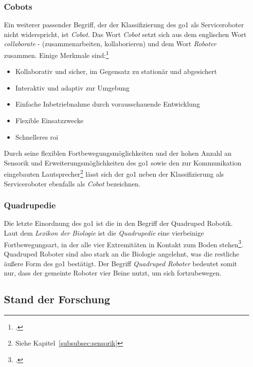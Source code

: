 \subsubsection{Cobots}

Ein weiterer passender Begriff, der der Klassifizierung des \gls{go1} als Serviceroboter nicht widerspricht, ist \emph{Cobot}.
Das Wort \emph{Cobot} setzt sich aus dem englischen Wort \emph{collaborate} - (zusammenarbeiten, kollaborieren) und dem Wort \emph{Roboter}
zusammen.
Einige Merkmale sind:\footcite{statista_robotics_market}

\begin{itemize}
    \item Kollaborativ und sicher, im Gegensatz zu stationär und abgesichert
    \item Interaktiv und adaptiv zur Umgebung
    \item Einfache Inbetriebnahme durch vorausschauende Entwicklung
    \item Flexible Einsatzzwecke
    \item Schnelleres \gls{roi}
\end{itemize}

Durch seine flexiblen Fortbewegungsmöglichkeiten und der hohen Anzahl an Sensorik und Erweiterungsmöglichkeiten des \gls{go1}
sowie den zur Kommunikation eingebauten Lautsprecher\footnote{Siehe Kapitel~\ref{subsubsec:sensorik}}
lässt sich der \gls{go1} neben der Klassifizierung als Serviceroboter ebenfalls als \emph{Cobot} bezeichnen.

\subsubsection{Quadrupedie}

Die letzte Einordnung des \gls{go1} ist die in den Begriff der Quadruped Robotik.
Laut dem \emph{Lexikon der Biologie} ist die \emph{Quadrupedie} eine vierbeinige Fortbewegungsart, in der alle vier
Extremitäten in Kontakt zum Boden stehen\footcite{quadrupedie}.
Quadruped Roboter sind also stark an die Biologie angelehnt, was die restliche äußere Form des \gls{go1} bestätigt.
Der Begriff \emph{Quadruped Roboter} bedeutet somit nur, dass der gemeinte Roboter vier Beine nutzt, um sich fortzubewegen.

\subsection{Stand der Forschung}
\label{subsec:stand-der-forschung}

